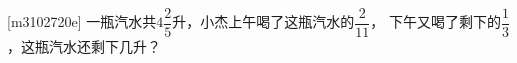 [m3102720e]\quad
一瓶汽水共$4\dfrac{2}{5}$升，小杰上午喝了这瓶汽水的$\dfrac{2}{11}$，
下午又喝了剩下的$\dfrac{1}{3}$，这瓶汽水还剩下几升？
\par
{}